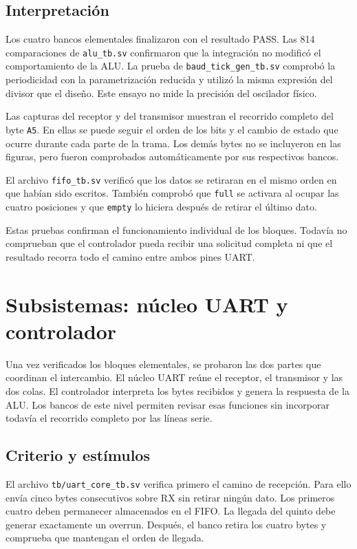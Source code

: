 \subsection{Interpretación}

Los cuatro bancos elementales finalizaron con el resultado PASS. Las
814 comparaciones de \texttt{alu\_tb.sv} confirmaron que la
integración no modificó el comportamiento de la ALU. La prueba de
\texttt{baud\_tick\_gen\_tb.sv} comprobó la periodicidad con la
parametrización reducida y utilizó la misma expresión del divisor que
el diseño. Este ensayo no mide la precisión del oscilador físico.

Las capturas del receptor y del transmisor muestran el recorrido
completo del byte \texttt{A5}. En ellas se puede seguir el orden de
los bits y el cambio de estado que ocurre durante cada parte de la
trama. Los demás bytes no se incluyeron en las figuras, pero fueron
comprobados automáticamente por sus respectivos bancos.

El archivo \texttt{fifo\_tb.sv} verificó que los datos se retiraran
en el mismo orden en que habían sido escritos. También comprobó que
\texttt{full} se activara al ocupar las cuatro posiciones y que
\texttt{empty} lo hiciera después de retirar el último dato.

Estas pruebas confirman el funcionamiento individual de los bloques.
Todavía no comprueban que el controlador pueda recibir una solicitud
completa ni que el resultado recorra todo el camino entre ambos pines UART.

\section{Subsistemas: núcleo UART y controlador}

Una vez verificados los bloques elementales, se probaron las dos
partes que coordinan el intercambio. El núcleo UART reúne el
receptor, el transmisor y las dos colas. El controlador interpreta
los bytes recibidos y genera la respuesta de la ALU. Los bancos de
este nivel permiten revisar esas funciones sin incorporar todavía el
recorrido completo por las líneas serie.

\subsection{Criterio y estímulos}

El archivo \texttt{tb/uart\_core\_tb.sv} verifica primero el camino
de recepción. Para ello envía cinco bytes consecutivos sobre RX sin
retirar ningún dato. Los primeros cuatro deben permanecer almacenados
en el FIFO. La llegada del quinto debe generar exactamente un
overrun. Después, el banco retira los cuatro bytes y comprueba que
mantengan el orden de llegada.

